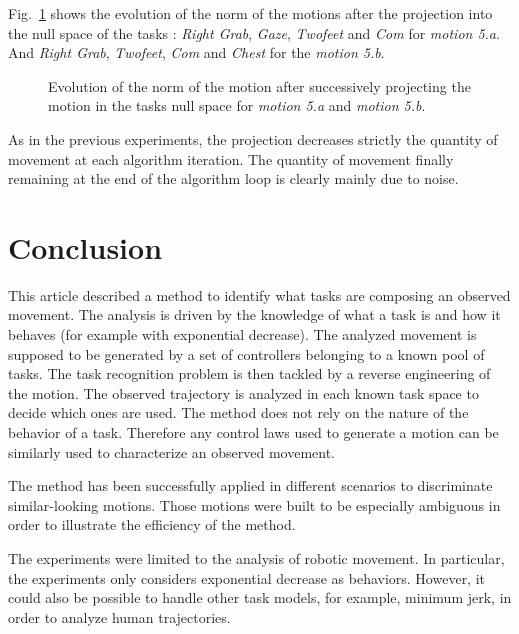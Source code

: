 \documentclass[journal]{IEEEtran}
\begin{document}
Fig.~\ref{fig:exp6:PqdotNorms5} shows the evolution of the norm of the motions after the projection
into the null space of the tasks : \emph{Right Grab},  \emph{Gaze}, \emph{Twofeet} and \emph{Com} for
\emph{motion 5.a}. And \emph{Right Grab}, \emph{Twofeet}, \emph{Com} and \emph{Chest} for the
\emph{motion 5.b}.
\begin{figure}[t]
  \centering
  \subfigure[Motion 5.a]{
  \resizebox{.48\textwidth}{!} {
    
  }
  }
  \subfigure[Motion 5.b]{
  \resizebox{.48\textwidth}{!} {
    
  }
}
\caption{Evolution of the norm of the motion after successively projecting the motion in the tasks null space for
\emph{motion 5.a} and \emph{motion 5.b}.}
\label{fig:exp6:PqdotNorms5}
\end{figure}
As in the previous experiments, the projection decreases strictly the quantity of movement
at each algorithm iteration. The quantity of movement finally remaining at the end of 
the algorithm loop is clearly mainly due to noise.



\section{Conclusion}
This article described a method to identify what tasks are composing an observed movement.
The analysis is driven by the knowledge
of what a task is and how it behaves (for example with exponential decrease). 
The analyzed movement is supposed to be generated by a set of 
controllers belonging to a known pool of tasks. 
The task recognition problem is then tackled by a reverse engineering of the motion.
The observed trajectory is analyzed
in each known task space to decide which ones are used.
The method does not rely on the nature of the behavior of a task. Therefore
any control laws used to generate a motion can be similarly
used to characterize an observed movement.

The method has been successfully applied in different
scenarios to discriminate similar-looking motions. Those motions were built to be especially
ambiguous in order to illustrate the efficiency of the method.

The experiments were limited to the analysis of robotic movement. In particular,
the experiments only considers exponential decrease as behaviors.
However, it could also be possible to handle other task models, for example, minimum jerk,
in order to analyze human trajectories.
\end{document}
